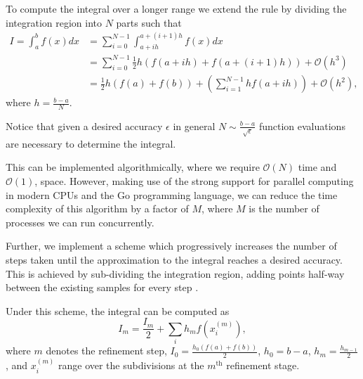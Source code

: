 \documentclass[10pt, a4paper]{article}
\begin{document}
  To compute the integral over a longer range we extend the rule by dividing the integration
  region into $N$ parts such that
  \begin{equation}
  \begin{split}
  I = \int_a^b f(x) dx & = \sum_{i=0}^{N-1} \int_{a+ih}^{a+(i+1)h} f(x) dx \\
  & = \sum_{i=0}^{N-1} \frac{1}{2} h (f(a+ih) + f(a+(i+1)h)) + \mathcal{O}(h^3) \\
  & = \frac{1}{2} h (f(a) + f(b)) + \left( \sum_{i=1}^{N-1} h f(a+ih) \right) + \mathcal{O}(h^2),
  \end{split}
  \end{equation}
  where $h = \frac{b-a}{N}$.

  Notice that given a desired accuracy $\epsilon$ in general $N \sim \frac{b-a}{\sqrt{\epsilon}}$
  function evaluations are necessary to determine the integral.


  This can be implemented algorithmically, where we require $\mathcal{O}(N)$ time and $\mathcal{O}(1)$,
  space. However, making use of the strong support for parallel computing in modern CPUs and the Go
  programming language, we can reduce the time complexity of this algorithm by a factor of $M$, where $M$
  is the number of processes we can run concurrently\footnotemark.


  Further, we implement a scheme which progressively increases the number of steps taken until the
  approximation to the integral reaches a desired accuracy. This is achieved by sub-dividing
  the integration region, adding points half-way between the existing samples for every step \cite{nr}.

  Under this scheme, the integral can be computed as
  \begin{equation}
  \label{eq:trap-rec}
  I_m = \frac{I_m}{2} + \sum_i h_m f(x^{(m)}_i),
  \end{equation}
  where $m$ denotes the refinement step, $I_0 = \frac{h_0 (f(a) + f(b))}{2}$, $h_0 = b-a$,
  $h_m = \frac{h_{m-1}}{2}$, and $x^{(m)}_i$
  range over the subdivisions at the $m^{\text{th}}$ refinement stage.
\end{document}
